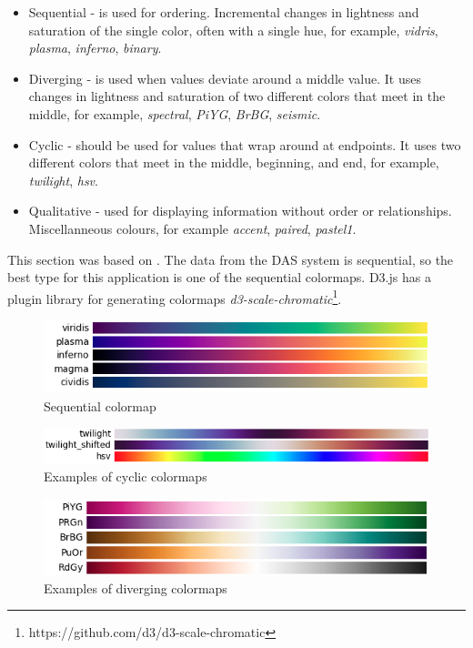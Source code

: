 \begin{itemize}
    \item Sequential - is used for ordering. Incremental changes in lightness and saturation of the single color, often with a single hue, for example, \textit{vidris}, \textit{plasma}, \textit{inferno}, \textit{binary}.
    \item Diverging - is used when values deviate around a middle value. It uses changes in lightness and saturation of two different colors that meet in the middle, for example, \textit{spectral}, \textit{PiYG}, \textit{BrBG}, \textit{seismic}.
    \item Cyclic - should be used for values that wrap around at endpoints. It uses two different colors that meet in the middle, beginning, and end, for example, \textit{twilight}, \textit{hsv}.
    \item Qualitative - used for displaying information without order or relationships. Miscellanneous colours, for example \textit{accent}, \textit{paired}, \textit{pastel1}.
\end{itemize}

This section was based on \cite{colormap}. The data from the DAS system is sequential, so the best type for this application is one of the sequential colormaps. D3.js has a plugin library for generating colormaps \textit{d3-scale-chromatic}\footnote{https://github.com/d3/d3-scale-chromatic}.

\begin{figure}[h!]
    \centering
    \includegraphics[width=.7\linewidth]{obrazky/sequential.png}
    \caption{Sequential colormap\cite{colormap}}
    \label{fig:colormap.seq}
\end{figure}

\begin{figure}[h!]
    \centering
    \includegraphics[width=.7\linewidth]{obrazky/cyclic.png}
    \caption{Examples of cyclic colormaps\cite{colormap}}
    \label{fig:colormap.cyc}
\end{figure}


\begin{figure}[h!]
    \centering
    \includegraphics[width=.7\linewidth]{obrazky/diverging.png}
    \caption{Examples of diverging colormaps\cite{colormap}}
    \label{fig:colormap.div}
\end{figure}


